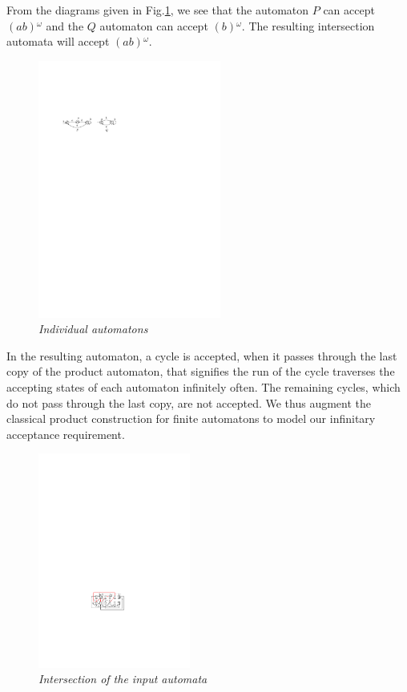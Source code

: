 \noindent
From the diagrams given in Fig.\ref{fig1}, we see that the automaton $P$ can accept $(ab){^\omega}$ 
and the $Q$ automaton can accept $(b){^\omega}$. The resulting intersection automata will accept
$(ab){^\omega}$. \\

\begin{figure}
\begin{center}
\includegraphics[width=60mm]{example_1.pdf}

\caption{{\em Individual automatons}} \label{fig1}
\end{center}
\end{figure}
 

\noindent
 In the resulting automaton, a cycle is accepted, when it passes through the last copy
 of the product automaton, that signifies the run of the cycle traverses the accepting states of each automaton infinitely often. The remaining cycles, 
 which do not pass through the last copy, are not accepted. We thus augment the classical product construction for finite automatons to model our infinitary acceptance requirement.

 
 \begin{figure}
\begin{center}
\includegraphics[width=50mm]{state_copy_transition_cycle.pdf}
\end{center}
\caption{{\em Intersection of the input automata}}
\label{transition}
\end{figure}

